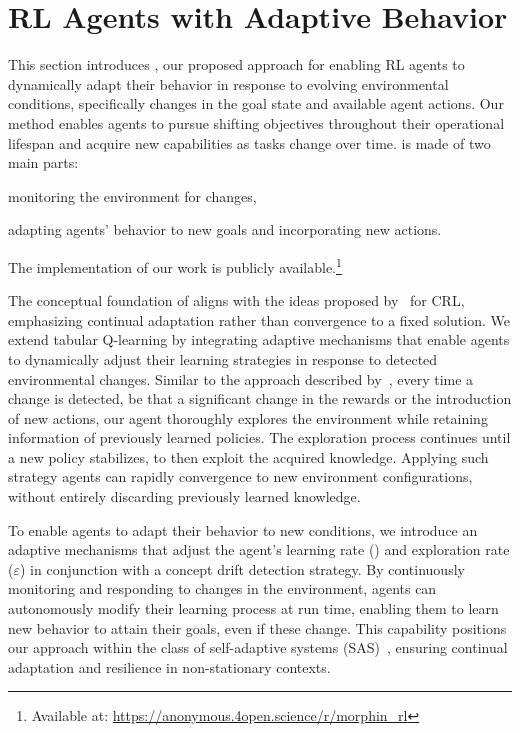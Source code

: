 
\section{\ac{RL} Agents with Adaptive Behavior}
\label{sec:implementation}

This section introduces \adaptiverl, our proposed approach for enabling \ac{RL} agents to 
dynamically adapt their behavior in response to evolving environmental conditions, specifically 
changes in the goal state and available agent actions. Our method enables agents to 
pursue shifting objectives throughout their operational lifespan and acquire new capabilities as 
tasks change over time. \adaptiverl is made of two main parts:
\begin{enumerate*}[label=(\arabic*)]
\item monitoring the environment for changes,
\item adapting agents' behavior to new goals and incorporating new actions.
\end{enumerate*}
The implementation of our work is publicly available.\footnote{Available at: \url{https://anonymous.4open.science/r/morphin_rl}}

The conceptual foundation of \adaptiverl aligns with the ideas proposed 
by~\citet{abel2023definitioncontinualreinforcementlearning} for \ac{CRL}, emphasizing continual 
adaptation rather than convergence to a fixed solution. We extend tabular Q-learning by integrating 
adaptive mechanisms that enable agents to dynamically adjust their learning strategies in response 
to detected environmental changes. Similar to the approach described 
by~\citet{norman2024firstexploreexploitmetalearningsolve}, every time a change is detected, be that 
a significant change in the rewards or the introduction of new actions, our agent thoroughly explores 
the environment while retaining information of previously learned policies. The exploration process 
continues until a new policy stabilizes, to then exploit the acquired knowledge. Applying such 
strategy agents can rapidly convergence to new environment configurations, without entirely 
discarding previously learned knowledge.

To enable agents to adapt their behavior to new conditions, we introduce an adaptive mechanisms 
that adjust the agent's learning rate (\lrate{\alpha}) and exploration rate ($\varepsilon$) in conjunction 
with a concept drift detection strategy. By continuously monitoring and responding to changes in the 
environment, agents can autonomously modify their learning process at run time, enabling them 
to learn new behavior to attain their goals, even if these change. This capability positions our 
approach within the class of self-adaptive systems (SAS)~\cite{sasreview}, ensuring continual 
adaptation and resilience in non-stationary contexts.

